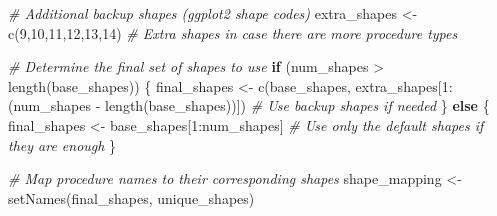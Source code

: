 \documentclass[
]{article}
\newenvironment{Shaded}{\begin{snugshade}}{\end{snugshade}}
\newcommand{\CommentTok}[1]{\textcolor[rgb]{0.56,0.35,0.01}{\textit{#1}}}
\newcommand{\ControlFlowTok}[1]{\textcolor[rgb]{0.13,0.29,0.53}{\textbf{#1}}}
\newcommand{\DecValTok}[1]{\textcolor[rgb]{0.00,0.00,0.81}{#1}}
\newcommand{\FunctionTok}[1]{\textcolor[rgb]{0.00,0.00,0.00}{#1}}
\newcommand{\NormalTok}[1]{\textcolor[rgb]{0.00,0.00,0.00}{#1}}
\newcommand{\OtherTok}[1]{\textcolor[rgb]{0.56,0.35,0.01}{#1}}
\newcommand{\SpecialCharTok}[1]{\textcolor[rgb]{0.00,0.00,0.00}{#1}}
\begin{document}
\begin{Shaded}
\begin{Highlighting}[]
\CommentTok{\# Additional backup shapes (ggplot2 shape codes)}
\NormalTok{extra\_shapes }\OtherTok{\textless{}{-}} \FunctionTok{c}\NormalTok{(}\DecValTok{9}\NormalTok{,}\DecValTok{10}\NormalTok{,}\DecValTok{11}\NormalTok{,}\DecValTok{12}\NormalTok{,}\DecValTok{13}\NormalTok{,}\DecValTok{14}\NormalTok{)  }
\CommentTok{\# Extra shapes in case there are more procedure types}

\CommentTok{\# Determine the final set of shapes to use}
\ControlFlowTok{if}\NormalTok{ (num\_shapes }\SpecialCharTok{\textgreater{}} \FunctionTok{length}\NormalTok{(base\_shapes)) \{}
\NormalTok{  final\_shapes }\OtherTok{\textless{}{-}} \FunctionTok{c}\NormalTok{(base\_shapes, }
\NormalTok{                    extra\_shapes[}\DecValTok{1}\SpecialCharTok{:}\NormalTok{(num\_shapes }\SpecialCharTok{{-}} \FunctionTok{length}\NormalTok{(base\_shapes))])  }
  \CommentTok{\# Use backup shapes if needed}
\NormalTok{\} }\ControlFlowTok{else}\NormalTok{ \{}
\NormalTok{  final\_shapes }\OtherTok{\textless{}{-}}\NormalTok{ base\_shapes[}\DecValTok{1}\SpecialCharTok{:}\NormalTok{num\_shapes]  }
  \CommentTok{\# Use only the default shapes if they are enough}
\NormalTok{\}}

\CommentTok{\# Map procedure names to their corresponding shapes}
\NormalTok{shape\_mapping }\OtherTok{\textless{}{-}} \FunctionTok{setNames}\NormalTok{(final\_shapes, unique\_shapes)}
\end{Highlighting}
\end{Shaded}
\end{document}
